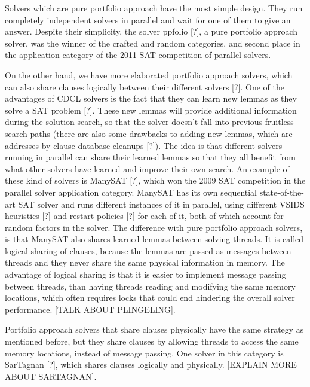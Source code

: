\documentclass{llncs}
\begin{document}
Solvers which are pure portfolio approach have the most simple
design. They run completely independent solvers in parallel and wait
for one of them to give an answer. Despite their simplicity, the
solver ppfolio [?], a pure portfolio approach solver, was the winner
of the crafted and random categories, and second place in the
application category of the 2011 SAT competition of parallel solvers.

On the other hand, we have more elaborated portfolio approach solvers,
which can also share clauses logically between their different solvers
[?]. One of the advantages of CDCL solvers is the fact that they can
learn new lemmas as they solve a SAT problem [?]. These new lemmas
will provide additional information during the solution search, so
that the solver doesn't fall into previous fruitless search paths
(there are also some drawbacks to adding new lemmas, which are
addresses by clause database cleanups [?]). The idea is that different
solvers running in parallel can share their learned lemmas so that
they all benefit from what other solvers have learned and improve
their own search. An example of these kind of solvers is ManySAT [?],
which won the 2009 SAT competition in the parallel solver application
category. ManySAT has its own sequential state-of-the-art SAT solver
and runs different instances of it in parallel, using different VSIDS
heuristics [?] and restart policies [?] for each of it, both of which
account for random factors in the solver. The difference with pure
portfolio approach solvers, is that ManySAT also shares learned lemmas
between solving threads. It is called logical sharing of clauses,
because the lemmas are passed as messages between threads and they
never share the same physical information in memory. The advantage of
logical sharing is that it is easier to implement message passing
between threads, than having threads reading and modifying the same
memory locations, which often requires locks that could end hindering
the overall solver performance. [TALK ABOUT PLINGELING].

Portfolio approach solvers that share clauses physically have the same
strategy as mentioned before, but they share clauses by allowing
threads to access the same memory locations, instead of message
passing. One solver in this category is SarTagnan [?], which shares
clauses logically and physically. [EXPLAIN MORE ABOUT SARTAGNAN].
\end{document}
